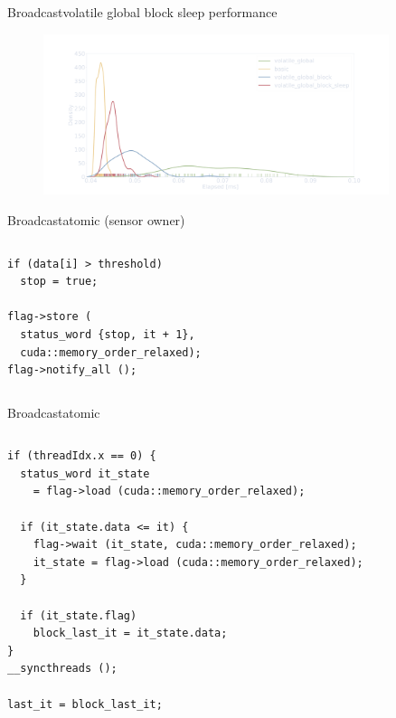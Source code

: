 \documentclass[aspectratio=169,compress]{beamer}
\begin{document}
\begin{frame}[fragile]{Broadcast}{volatile global block sleep performance}
\centering
	\begin{figure}
		\includegraphics[width=0.9\textwidth]{density_04.pdf}
	\end{figure}
\end{frame}

\begin{frame}[fragile]{Broadcast}{atomic (sensor owner)}
	\begin{columns}
			\begin{column}{0.6\textwidth}
\begin{lstlisting}[]
if (data[i] > threshold)
  stop = true;

flag->store (
  status_word {stop, it + 1}, 
  cuda::memory_order_relaxed);
flag->notify_all ();
\end{lstlisting}
			\end{column}
	\end{columns}
\end{frame}

\begin{frame}[fragile]{Broadcast}{atomic}
	\begin{columns}
			\begin{column}{0.7\textwidth}
\begin{lstlisting}[title={other threads}]
if (threadIdx.x == 0) {
  status_word it_state 
    = flag->load (cuda::memory_order_relaxed);
  
  if (it_state.data <= it) {
    flag->wait (it_state, cuda::memory_order_relaxed);
    it_state = flag->load (cuda::memory_order_relaxed);
  }
  
  if (it_state.flag)
    block_last_it = it_state.data;
}
__syncthreads ();

last_it = block_last_it;
\end{lstlisting}
			\end{column}
	\end{columns}
\end{frame}
\end{document}
